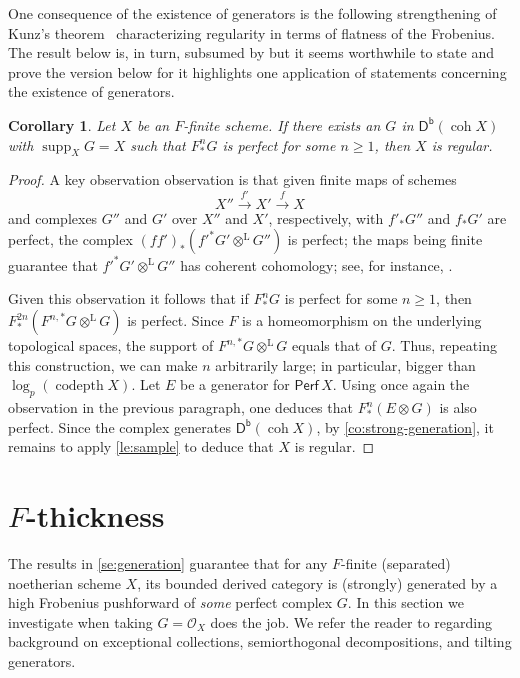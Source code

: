 \documentclass{amsart}
\newcommand{\perf}[1]{\mathsf{Perf}\,#1}
\newcommand{\coh}{\operatorname{coh}}
\newcommand{\dbcat}[1]{\cat{D}^{\mathsf{b}}(#1)}
\newcommand{\mco}{\mathcal{O}}
\newcommand{\cat}[1]{{\mathsf{#1}}}
\newcommand{\codepth}{\operatorname{codepth}}
\newcommand{\lotimes}{\otimes^{\operatorname{L}}}
\newcommand{\supp}{\operatorname{supp}}
\newtheorem{corollary}[subsection]{Corollary}
\theoremstyle{definition}
\theoremstyle{remark}
\numberwithin{equation}{subsection}
\begin{document}
One consequence of the existence of generators is the following strengthening of Kunz's theorem~\cite[Theorem~2.1]{Kunz:1969} characterizing regularity in terms of flatness of the Frobenius. The result below is, in turn, subsumed by \cite[Theorem~1.1]{Avramov/Hochster/Iyengar/Yao:2012} but it seems worthwhile to state and prove the version below for it highlights one application of statements concerning the existence of generators. 

\begin{corollary}
\label{co:kunz}
Let $X$ be an $F$-finite scheme. If there exists an $G$ in $\dbcat{\coh X}$ with $\supp_XG=X$ such that $F^n_*G$ is perfect for some $n\ge 1$, then $X$ is regular.
\end{corollary} 

\begin{proof}
A key observation observation is that given finite maps of schemes 
\[
X''\xrightarrow{f'}X'\xrightarrow{f} X
\]
and complexes $G''$ and $G'$ over $X''$ and $X'$, respectively, with $f'_*G''$ and $f_*G'$ are perfect, the complex $(ff')_*({f'}^{*}G'\lotimes G'')$ is perfect; the maps being finite guarantee that ${f'}^{*}G'\lotimes G''$ has coherent cohomology; see, for instance, \cite[Corollary~3.4]{Berthelot/Gorthendieck/Illusie:1971}. 

Given this observation it follows that if $F^n_*G$ is perfect for some $n\ge 1$, then $F^{2n}_*(F^{n,*}G\lotimes G)$ is perfect. Since $F$ is a homeomorphism on the underlying topological spaces, the support of $F^{n,*}G\lotimes G$ equals that of $G$. Thus, repeating this construction, we can make $n$ arbitrarily large; in particular, bigger than $\log_p(\codepth X)$. Let $E$ be a generator for $\perf X$. Using once again the observation in the previous paragraph, one deduces that $F^n_*(E\otimes G)$ is also perfect. Since  the complex generates $\dbcat{\coh X}$, by \cref{co:strong-generation}, it remains to apply \cref{le:sample} to deduce that $X$ is regular.
\end{proof}

\section{\texorpdfstring{$F$}{F}-thickness} 
\label{se:F-thickness}

The results in \cref{se:generation} guarantee that for any $F$-finite (separated) noetherian scheme $X$, its bounded derived category is (strongly) generated by a high Frobenius pushforward of \emph{some} perfect complex $G$. In this section we investigate when taking $G=\mco_X$ does the job. We refer the reader to \cite{Huybrechts:2006} regarding background on exceptional collections, semiorthogonal decompositions, and tilting generators.
\end{document}

